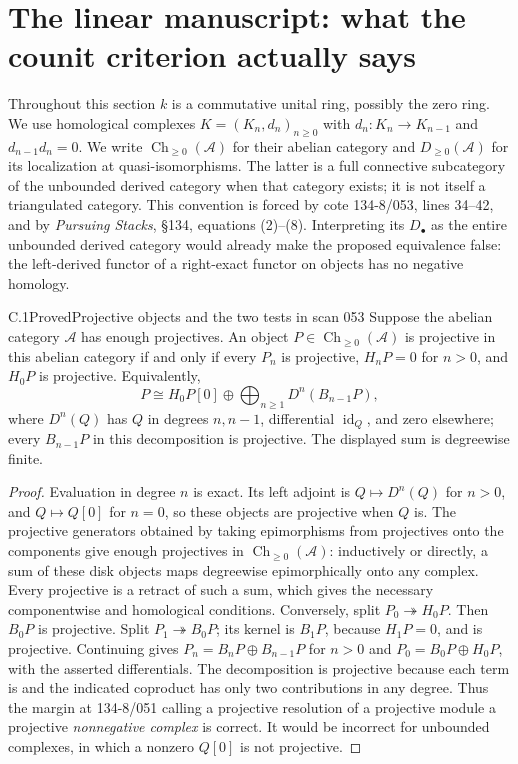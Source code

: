 \section{The linear manuscript: what the counit criterion actually says}\label{sec:C}
\providecommand{\Ch}{\operatorname{Ch}}
\providecommand{\Mod}{\operatorname{Mod}}
\providecommand{\coker}{\operatorname{coker}}
\providecommand{\Tot}{\operatorname{Tot}}
\providecommand{\id}{\operatorname{id}}

Throughout this section $k$ is a commutative unital ring, possibly the zero ring. We use homological complexes $K=(K_n,d_n)_{n\geq0}$ with $d_n:K_n\to K_{n-1}$ and $d_{n-1}d_n=0$. We write $\Ch_{\geq0}(\mathcal A)$ for their abelian category and $D_{\geq0}(\mathcal A)$ for its localization at quasi-isomorphisms. The latter is a full connective subcategory of the unbounded derived category when that category exists; it is not itself a triangulated category. This convention is forced by cote 134-8/053, lines 34--42, and by \emph{Pursuing Stacks}, \S134, equations (2)--(8). Interpreting its $D_\bullet$ as the entire unbounded derived category would already make the proposed equivalence false: the left-derived functor of a right-exact functor on objects has no negative homology.

\begin{claim}{C.1}{Proved}{Projective objects and the two tests in scan 053}\label{C1}
Suppose the abelian category $\mathcal A$ has enough projectives. An object $P\in\Ch_{\geq0}(\mathcal A)$ is projective in this abelian category if and only if every $P_n$ is projective, $H_nP=0$ for $n>0$, and $H_0P$ is projective. Equivalently,
\[
 P\cong H_0P[0]\oplus\bigoplus_{n\geq1}D^n(B_{n-1}P),
\]
where $D^n(Q)$ has $Q$ in degrees $n,n-1$, differential $\id_Q$, and zero elsewhere; every $B_{n-1}P$ in this decomposition is projective. The displayed sum is degreewise finite.
\end{claim}
\begin{proof}
Evaluation in degree $n$ is exact. Its left adjoint is $Q\mapsto D^n(Q)$ for $n>0$, and $Q\mapsto Q[0]$ for $n=0$, so these objects are projective when $Q$ is. The projective generators obtained by taking epimorphisms from projectives onto the components give enough projectives in $\Ch_{\geq0}(\mathcal A)$: inductively or directly, a sum of these disk objects maps degreewise epimorphically onto any complex. Every projective is a retract of such a sum, which gives the necessary componentwise and homological conditions. Conversely, split $P_0\twoheadrightarrow H_0P$. Then $B_0P$ is projective. Split $P_1\twoheadrightarrow B_0P$; its kernel is $B_1P$, because $H_1P=0$, and is projective. Continuing gives $P_n=B_nP\oplus B_{n-1}P$ for $n>0$ and $P_0=B_0P\oplus H_0P$, with the asserted differentials. The decomposition is projective because each term is and the indicated coproduct has only two contributions in any degree. Thus the margin at 134-8/051 calling a projective resolution of a projective module a projective \emph{nonnegative complex} is correct. It would be incorrect for unbounded complexes, in which a nonzero $Q[0]$ is not projective.
\end{proof}


